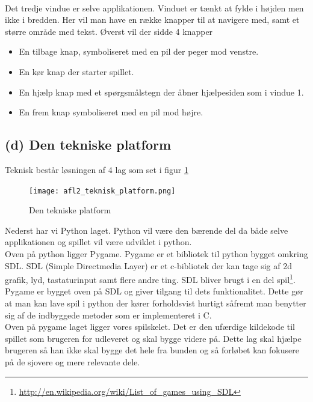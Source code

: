 \documentclass[10pt,a4paper,danish]{article}
\begin{document}
\paragraph{}
Det tredje vindue er selve applikationen.
Vinduet er tænkt at fylde i højden men ikke i bredden.
Her vil man have en række knapper til at navigere med, samt et større område med tekst.
Øverst vil der sidde 4 knapper
\begin{itemize}
  \item En tilbage knap, symboliseret med en pil der peger mod venstre.
  \item En kør knap der starter spillet.
  \item En hjælp knap med et spørgsmålstegn der åbner hjælpesiden som i vindue 1.
  \item En frem knap symboliseret med en pil mod højre.
\end{itemize}


\subsection{(d) Den tekniske platform}
Teknisk består løsningen af 4 lag som set i figur \ref{fig:tekniskeplatform}
\begin{figure}[h]
  \begin{center}
    \texttt{[image: afl2\_teknisk\_platform.png]}
    \caption{Den tekniske platform}
    \label{fig:tekniskeplatform}
  \end{center}
\end{figure}

Nederst har vi Python laget. Python vil være den bærende del da både selve applikationen og spillet vil være udviklet i python.\\

Oven på python ligger Pygame. Pygame er et bibliotek til python bygget omkring SDL.
SDL (Simple Directmedia Layer) er et c-bibliotek der kan tage sig af 2d grafik, lyd, tastaturinput samt flere andre ting. SDL bliver brugt i en del spil\footnote{\url{http://en.wikipedia.org/wiki/List_of_games_using_SDL}}.
Pygame er bygget oven på SDL og giver tilgang til dets funktionalitet. Dette gør at man kan lave spil i python der kører forholdsvist hurtigt såfremt man benytter sig af de indbyggede metoder som er implementeret i C.\\

Oven på pygame laget ligger vores spilskelet. Det er den ufærdige kildekode til spillet som brugeren for udleveret og skal bygge videre på.
Dette lag skal hjælpe brugeren så han ikke skal bygge det hele fra bunden og så forløbet kan fokusere på de sjovere og mere relevante dele.\\
\end{document}
